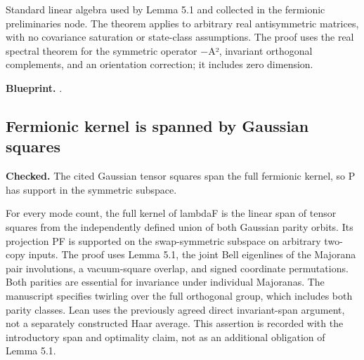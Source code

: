 Standard linear algebra used by Lemma 5.1 and collected in the fermionic preliminaries node. The theorem applies to arbitrary real antisymmetric matrices, with no covariance saturation or state-class assumptions. The proof uses the real spectral theorem for the symmetric operator −A², invariant orthogonal complements, and an orientation correction; it includes zero dimension.


\textbf{Blueprint.} .

\subsection{Fermionic kernel is spanned by Gaussian squares}\label{paper:fermion-kernel-span}
\textbf{Checked.} The cited Gaussian tensor squares span the full fermionic kernel, so P has support in the symmetric subspace. 

For every mode count, the full kernel of lambdaF is the linear span of tensor squares from the independently defined union of both Gaussian parity orbits. Its projection PF is supported on the swap-symmetric subspace on arbitrary two-copy inputs. The proof uses Lemma 5.1, the joint Bell eigenlines of the Majorana pair involutions, a vacuum-square overlap, and signed coordinate permutations. Both parities are essential for invariance under individual Majoranas. The manuscript specifies twirling over the full orthogonal group, which includes both parity classes. Lean uses the previously agreed direct invariant-span argument, not a separately constructed Haar average. This assertion is recorded with the introductory span and optimality claim, not as an additional obligation of Lemma 5.1.


